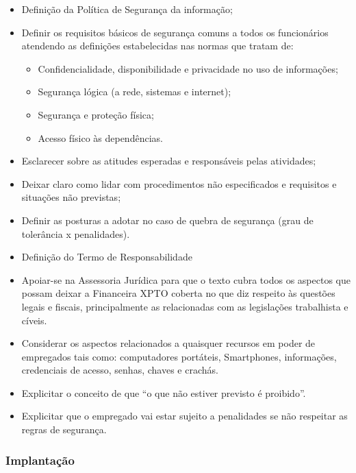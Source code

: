 \documentclass[a4paper,12pt]{article}
\begin{document}
\begin{itemize}
    \item Definição da Política de Segurança da informação;
    \item Definir os requisitos básicos de segurança comuns a todos os funcionários atendendo as definições estabelecidas nas normas que tratam de:
    \begin{itemize}
        \item Confidencialidade, disponibilidade e privacidade no uso de informações;
        \item Segurança lógica (a rede, sistemas e internet);
        \item Segurança e proteção física;
        \item Acesso físico às dependências.
    \end{itemize}
    \item Esclarecer sobre as atitudes esperadas e responsáveis pelas atividades;
    \item Deixar claro como lidar com procedimentos não especificados e requisitos e situações não previstas;
    \item Definir as posturas a adotar no caso de quebra de segurança (grau de tolerância x penalidades).
    \item Definição do Termo de Responsabilidade
    \item Apoiar-se na Assessoria Jurídica para que o texto cubra todos os aspectos que possam deixar a Financeira XPTO coberta no que diz respeito às questões legais e fiscais, principalmente as relacionadas com as legislações trabalhista e cíveis.
    \item Considerar os aspectos relacionados a quaisquer recursos em poder de empregados tais como: computadores portáteis, Smartphones, informações, credenciais de acesso, senhas, chaves e crachás.
    \item Explicitar o conceito de que “o que não estiver previsto é proibido”.
    \item Explicitar que o empregado vai estar sujeito a penalidades se não respeitar as regras de segurança.
\end{itemize}

\subsubsection{Implantação}
\end{document}
